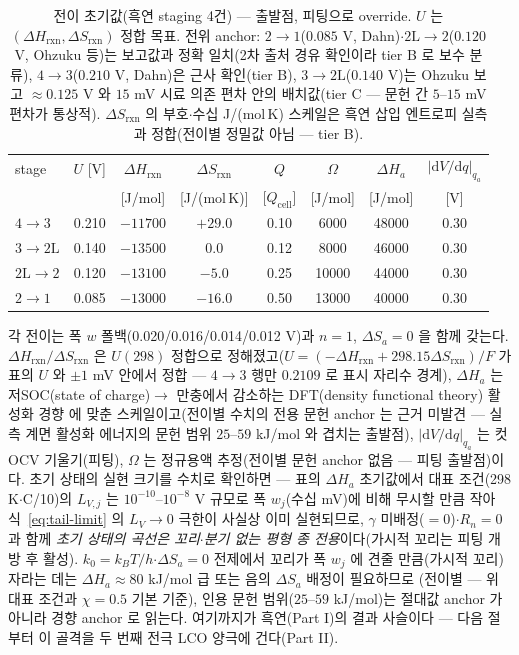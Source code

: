 \documentclass[11pt,a4paper]{article}
\newcommand{\dd}{\mathrm{d}}
\newcommand{\cell}{\mathrm{cell}}
\newcommand{\rxn}{\mathrm{rxn}}
\begin{document}
\begin{table}[t]
\centering
\renewcommand{\arraystretch}{1.25}
\caption{전이 초기값(흑연 staging 4건) — 출발점, 피팅으로 override. $U$ 는 $(\Delta H_\rxn,\Delta S_\rxn)$
정합 목표. 전위 anchor: $2\!\to\!1$($0.085$ V, Dahn\cite{dahn1991})$\cdot$$2\mathrm
L\!\to\!2$($0.120$ V, Ohzuku 등\cite{ohzuku1993})는 보고값과 정확 일치(2차 출처 경유 확인이라 tier B 로
보수 분류), $4\!\to\!3$($0.210$ V, Dahn\cite{dahn1991})은 근사 확인(tier B),
$3\!\to\!2\mathrm L$($0.140$ V)는 Ohzuku 보고 $\approx0.125$ V 와 $15$ mV 시료 의존
편차 안의 배치값(tier C — 문헌 간 $5$--$15$ mV 편차가 통상적). $\Delta S_\rxn$ 의 부호$\cdot$수십
J/(mol\,K) 스케일은 흑연 삽입 엔트로피 실측\cite{reynier2003} 과 정합(전이별 정밀값 아님 — tier B).}
\label{tab:staging}
\begin{tabular}{l c c c c c c c}
\toprule
stage & $U$ [V] & $\Delta H_\rxn$ & $\Delta S_\rxn$ & $Q$ & $\Omega$ & $\Delta H_a$ & $|\dd V/\dd q|_{q_a}$ \\
 &  & [J/mol] & [J/(mol\,K)] & [$Q_\cell$] & [J/mol] & [J/mol] & [V] \\
\midrule
$4\!\to\!3$   & 0.210 & $-11700$ & $+29.0$ & 0.10 & 6000  & 48000 & 0.30 \\
$3\!\to\!2\mathrm L$ & 0.140 & $-13500$ & $0.0$   & 0.12 & 8000  & 46000 & 0.30 \\
$2\mathrm L\!\to\!2$ & 0.120 & $-13100$ & $-5.0$  & 0.25 & 10000 & 44000 & 0.30 \\
$2\!\to\!1$   & 0.085 & $-13000$ & $-16.0$ & 0.50 & 13000 & 40000 & 0.30 \\
\bottomrule
\end{tabular}
\end{table}

각 전이는 폭 $w$ 폴백(0.020/0.016/0.014/0.012 V)과 $n=1$, $\Delta S_a=0$ 을 함께 갖는다. $\Delta H_\rxn/\Delta S_\rxn$
은 $U(298)$ 정합으로 정해졌고($U=(-\Delta H_\rxn+298.15\Delta S_\rxn)/F$ 가 표의 $U$ 와 $\pm1$ mV 안에서 정합 — $4\!\to\!3$ 행만 $0.2109$ 로 표시 자리수 경계), $\Delta H_a$ 는 저SOC(state of charge)$\to$
만충에서 감소하는 DFT(density functional theory) 활성화 경향\cite{persson2010,persson2010b} 에 맞춘
스케일이고(전이별 수치의 전용 문헌 anchor 는 근거 미발견 — 실측 계면 활성화 에너지의 문헌 범위
$25$--$59$ kJ/mol 와 겹치는 출발점), $|\dd V/\dd q|_{q_a}$ 는 컷 OCV 기울기(피팅), $\Omega$ 는 정규용액
추정(전이별 문헌 anchor 없음 — 피팅 출발점)이다.
초기 상태의 실현 크기를 수치로 확인하면 --- 표의 $\Delta H_a$ 초기값에서 대표 조건(298 K$\cdot$C/10)의
$L_{V,j}$ 는 $10^{-10}$--$10^{-8}$ V 규모로 폭 $w_j$(수십 mV)에 비해 무시할 만큼 작아 식~\eqref{eq:tail-limit} 의 $L_V\to0$ 극한이 사실상 이미 실현되므로, $\gamma$ 미배정($=0$)$\cdot$$R_n=0$ 과 함께 \emph{초기 상태의 곡선은 꼬리$\cdot$분기 없는 평형
종 전용}이다(가시적 꼬리는 피팅 개방 후 활성). $k_0=k_BT/h$$\cdot$$\Delta S_a{=}0$ 전제에서 꼬리가
폭 $w_j$ 에 견줄 만큼(가시적 꼬리) 자라는 데는 $\Delta H_a\approx80$ kJ/mol 급 또는 음의 $\Delta S_a$ 배정이 필요하므로
(전이별 --- 위 대표 조건과 $\chi=0.5$ 기본 기준), 인용 문헌
범위($25$--$59$ kJ/mol)는 절대값 anchor 가 아니라 경향 anchor 로 읽는다.
여기까지가 흑연(Part I)의 결과 사슬이다 — 다음 절부터 이 골격을 두 번째 전극 LCO 양극에 건다(Part II).
\end{document}
